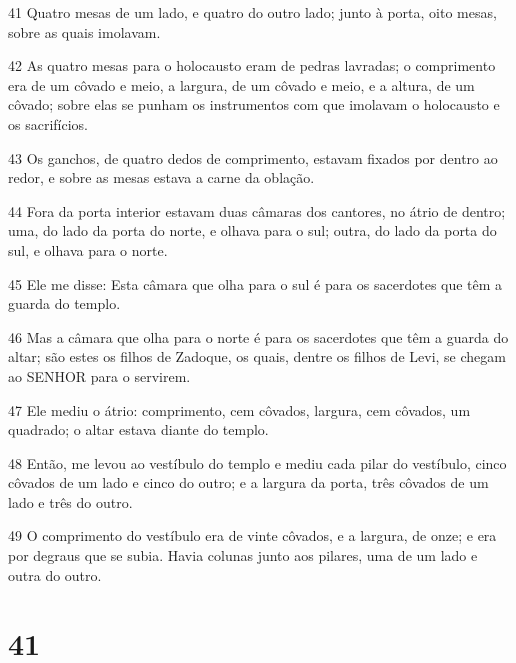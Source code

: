 \par 41 Quatro mesas de um lado, e quatro do outro lado; junto à porta, oito mesas, sobre as quais imolavam.
\par 42 As quatro mesas para o holocausto eram de pedras lavradas; o comprimento era de um côvado e meio, a largura, de um côvado e meio, e a altura, de um côvado; sobre elas se punham os instrumentos com que imolavam o holocausto e os sacrifícios.
\par 43 Os ganchos, de quatro dedos de comprimento, estavam fixados por dentro ao redor, e sobre as mesas estava a carne da oblação.
\par 44 Fora da porta interior estavam duas câmaras dos cantores, no átrio de dentro; uma, do lado da porta do norte, e olhava para o sul; outra, do lado da porta do sul, e olhava para o norte.
\par 45 Ele me disse: Esta câmara que olha para o sul é para os sacerdotes que têm a guarda do templo.
\par 46 Mas a câmara que olha para o norte é para os sacerdotes que têm a guarda do altar; são estes os filhos de Zadoque, os quais, dentre os filhos de Levi, se chegam ao SENHOR para o servirem.
\par 47 Ele mediu o átrio: comprimento, cem côvados, largura, cem côvados, um quadrado; o altar estava diante do templo.
\par 48 Então, me levou ao vestíbulo do templo e mediu cada pilar do vestíbulo, cinco côvados de um lado e cinco do outro; e a largura da porta, três côvados de um lado e três do outro.
\par 49 O comprimento do vestíbulo era de vinte côvados, e a largura, de onze; e era por degraus que se subia. Havia colunas junto aos pilares, uma de um lado e outra do outro.

\chapter{41}

